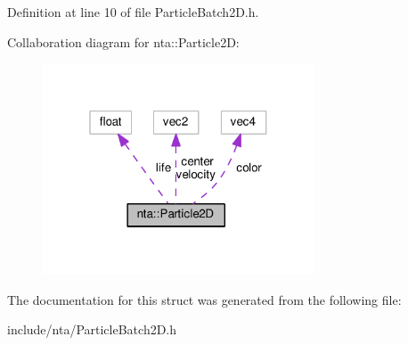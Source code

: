 Definition at line 10 of file Particle\+Batch2\+D.\+h.



Collaboration diagram for nta\+:\+:Particle2D\+:
\nopagebreak
\begin{figure}[H]
\begin{center}
\leavevmode
\includegraphics[width=229pt]{df/d87/structnta_1_1Particle2D__coll__graph}
\end{center}
\end{figure}


The documentation for this struct was generated from the following file\+:\begin{DoxyCompactItemize}
\item 
include/nta/Particle\+Batch2\+D.\+h\end{DoxyCompactItemize}
